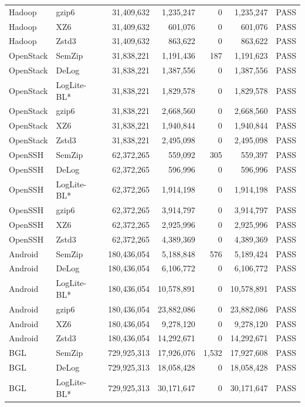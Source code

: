 \begin{longtable}{llrrrrl}
Hadoop & gzip6 & 31,409,632 & 1,235,247 & 0 & 1,235,247 & PASS \\
Hadoop & XZ6 & 31,409,632 & 601,076 & 0 & 601,076 & PASS \\
Hadoop & Zstd3 & 31,409,632 & 863,622 & 0 & 863,622 & PASS \\
OpenStack & SemZip & 31,838,221 & 1,191,436 & 187 & 1,191,623 & PASS \\
OpenStack & DeLog & 31,838,221 & 1,387,556 & 0 & 1,387,556 & PASS \\
OpenStack & LogLite-BL* & 31,838,221 & 1,829,578 & 0 & 1,829,578 & PASS \\
OpenStack & gzip6 & 31,838,221 & 2,668,560 & 0 & 2,668,560 & PASS \\
OpenStack & XZ6 & 31,838,221 & 1,940,844 & 0 & 1,940,844 & PASS \\
OpenStack & Zstd3 & 31,838,221 & 2,495,098 & 0 & 2,495,098 & PASS \\
OpenSSH & SemZip & 62,372,265 & 559,092 & 305 & 559,397 & PASS \\
OpenSSH & DeLog & 62,372,265 & 596,996 & 0 & 596,996 & PASS \\
OpenSSH & LogLite-BL* & 62,372,265 & 1,914,198 & 0 & 1,914,198 & PASS \\
OpenSSH & gzip6 & 62,372,265 & 3,914,797 & 0 & 3,914,797 & PASS \\
OpenSSH & XZ6 & 62,372,265 & 2,925,996 & 0 & 2,925,996 & PASS \\
OpenSSH & Zstd3 & 62,372,265 & 4,389,369 & 0 & 4,389,369 & PASS \\
Android & SemZip & 180,436,054 & 5,188,848 & 576 & 5,189,424 & PASS \\
Android & DeLog & 180,436,054 & 6,106,772 & 0 & 6,106,772 & PASS \\
Android & LogLite-BL* & 180,436,054 & 10,578,891 & 0 & 10,578,891 & PASS \\
Android & gzip6 & 180,436,054 & 23,882,086 & 0 & 23,882,086 & PASS \\
Android & XZ6 & 180,436,054 & 9,278,120 & 0 & 9,278,120 & PASS \\
Android & Zstd3 & 180,436,054 & 14,292,671 & 0 & 14,292,671 & PASS \\
BGL & SemZip & 729,925,313 & 17,926,076 & 1,532 & 17,927,608 & PASS \\
BGL & DeLog & 729,925,313 & 18,058,428 & 0 & 18,058,428 & PASS \\
BGL & LogLite-BL* & 729,925,313 & 30,171,647 & 0 & 30,171,647 & PASS \\

\end{longtable}
